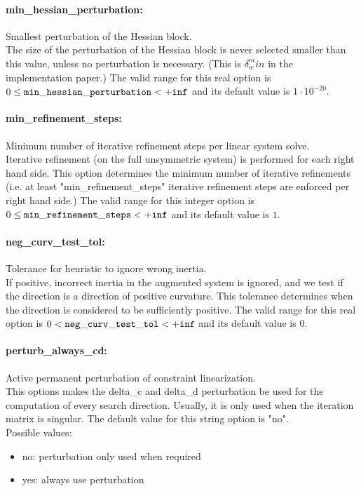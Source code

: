 \paragraph{min\_hessian\_perturbation:}\label{sec:min_hessian_perturbation} Smallest perturbation of the Hessian block. $\;$ \\
 The size of the perturbation of the Hessian block
is never selected smaller than this value, unless
no perturbation is necessary. (This is
$\delta_w^min$ in the implementation paper.) The valid range for this real option is 
$0 \le {\tt min\_hessian\_perturbation } <  {\tt +inf}$
and its default value is $1 \cdot 10^{-20}$.


\paragraph{min\_refinement\_steps:}\label{sec:min_refinement_steps} Minimum number of iterative refinement steps per linear system solve. $\;$ \\
 Iterative refinement (on the full unsymmetric
system) is performed for each right hand side. 
This option determines the minimum number of
iterative refinements (i.e. at least
"min\_refinement\_steps" iterative refinement
steps are enforced per right hand side.) The valid range for this integer option is
$0 \le {\tt min\_refinement\_steps } <  {\tt +inf}$
and its default value is $1$.


\paragraph{neg\_curv\_test\_tol:}\label{sec:neg_curv_test_tol} Tolerance for heuristic to ignore wrong inertia. $\;$ \\
 If positive, incorrect inertia in the augmented
system is ignored, and we test if the direction
is a direction of positive curvature.  This
tolerance determines when the direction is
considered to be sufficiently positive. The valid range for this real option is 
$0 <  {\tt neg\_curv\_test\_tol } <  {\tt +inf}$
and its default value is $0$.


\paragraph{perturb\_always\_cd:}\label{sec:perturb_always_cd} Active permanent perturbation of constraint linearization. $\;$ \\
 This options makes the delta\_c and delta\_d
perturbation be used for the computation of every
search direction.  Usually, it is only used when
the iteration matrix is singular.
The default value for this string option is "no".
\\ 
Possible values:
\begin{itemize}
   \item no: perturbation only used when required
   \item yes: always use perturbation
\end{itemize}

